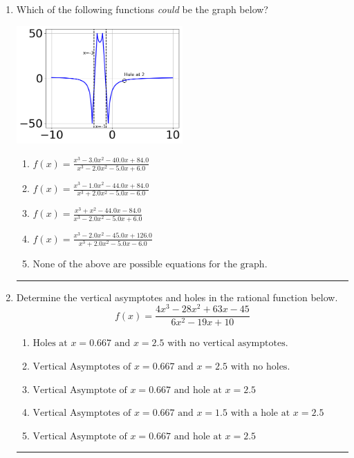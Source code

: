 \documentclass[14pt]{extbook}
\newcommand{\litem}[1]{\item#1\hspace*{-1cm}\rule{\textwidth}{0.4pt}}
\begin{document}
\begin{enumerate}
{\begin{enumerate}[label=\Alph*.]
\end{enumerate} }
\litem{
Which of the following functions \textit{could} be the graph below?
\begin{center}
    \includegraphics[width=0.5\textwidth]{../Figures/identifyGraphOfRationalFunctionB.png}
\end{center}
\begin{enumerate}[label=\Alph*.]
\item \( f(x)=\frac{x^{3} -3.0 x^{2} -40.0 x + 84.0}{x^{3} -2.0 x^{2} -5.0 x + 6.0} \)
\item \( f(x)=\frac{x^{3} -1.0 x^{2} -44.0 x + 84.0}{x^{3} +2.0 x^{2} -5.0 x -6.0} \)
\item \( f(x)=\frac{x^{3} + x^{2} -44.0 x -84.0}{x^{3} -2.0 x^{2} -5.0 x + 6.0} \)
\item \( f(x)=\frac{x^{3} -2.0 x^{2} -45.0 x + 126.0}{x^{3} +2.0 x^{2} -5.0 x -6.0} \)
\item \( \text{None of the above are possible equations for the graph.} \)

\end{enumerate} }
\litem{
Determine the vertical asymptotes and holes in the rational function below.\[ f(x) = \frac{4x^{3} -28 x^{2} +63 x -45}{6x^{2} -19 x + 10} \]\begin{enumerate}[label=\Alph*.]
\item \( \text{Holes at } x = 0.667 \text{ and } x = 2.5 \text{ with no vertical asymptotes.} \)
\item \( \text{Vertical Asymptotes of } x = 0.667 \text{ and } x = 2.5 \text{ with no holes.} \)
\item \( \text{Vertical Asymptote of } x = 0.667 \text{ and hole at } x = 2.5 \)
\item \( \text{Vertical Asymptotes of } x = 0.667 \text{ and } x = 1.5 \text{ with a hole at } x = 2.5 \)
\item \( \text{Vertical Asymptote of } x = 0.667 \text{ and hole at } x = 2.5 \)


\end{enumerate}}
\end{enumerate}
\end{document}

